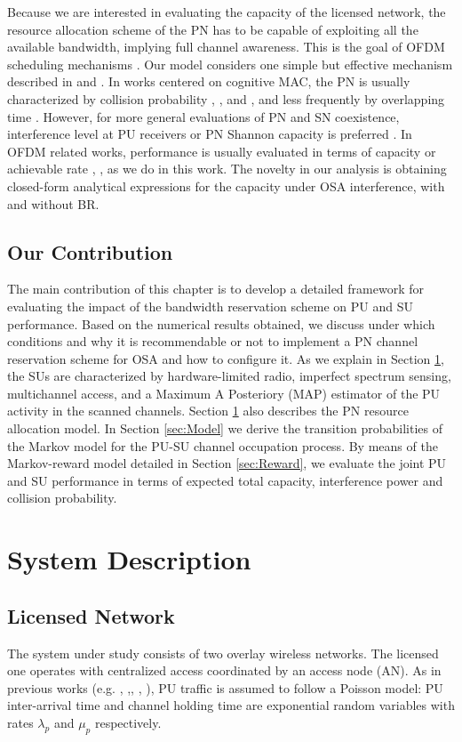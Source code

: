 Because we are interested in evaluating the capacity of the licensed network, the resource allocation scheme of the PN has to be capable of exploiting all the available bandwidth, implying full channel awareness. This is the goal of OFDM scheduling mechanisms \cite{ref:OFDMtutorial}. Our model considers one simple but effective mechanism described in \cite{ref:OFDMtutorial} and \cite{ref:PSD}.
In works centered on cognitive MAC, the PN is usually characterized by collision probability \cite{ref:MultichannelMultistage}, \cite{ref:PacketConstraints}, \cite{ref:POMDP} and \cite{ref:OptimalStrategies}, and less frequently by overlapping time \cite{ref:OpportunisticAccess}.
However, for more general evaluations of PN and SN coexistence, interference level at PU receivers or PN Shannon capacity is preferred \cite{ref:Coexistence}. In OFDM related works, performance is usually evaluated in terms of capacity or achievable rate \cite{ref:OFDMtutorial}, \cite{ref:PSD}, as we do in this work. The novelty in our analysis is obtaining closed-form analytical expressions for the capacity under OSA interference, with and without BR.

\subsection{Our Contribution}
The main contribution of this chapter is to develop a detailed framework for evaluating the impact of the bandwidth reservation scheme on PU and SU performance.
Based on the numerical results obtained, we discuss under which conditions and why it is recommendable or not to implement a PN channel reservation scheme for OSA and how to configure it.
As we explain in Section \ref{sec:System}, the SUs are characterized by hardware-limited radio, imperfect spectrum sensing, multichannel access, and a Maximum A Posteriory (MAP) estimator of the PU activity in the scanned channels. Section \ref{sec:System} also describes the PN resource allocation model.
In Section \ref{sec:Model} we derive the transition probabilities of the Markov model for the PU-SU channel occupation process.
By means of the Markov-reward model detailed in Section \ref{sec:Reward}, we evaluate the joint PU and SU performance in terms of expected total capacity, interference power and collision probability.

\section{System Description}\label{sec:System}
\subsection{Licensed Network}
The system under study consists of two overlay wireless networks. The licensed one operates with centralized access coordinated by an access node (AN). 
As in previous works (e.g. \cite{ref:POMDP}, \cite{ref:DiscoveringOpportunities},\cite{ref:Gelabert}, \cite{ref:Pla}, \cite{ref:Modelling}), PU traffic is assumed to follow a Poisson model: PU inter-arrival time and channel holding time are exponential random variables with rates $\lambda_{p}$ and $\mu_{p}$ respectively.

